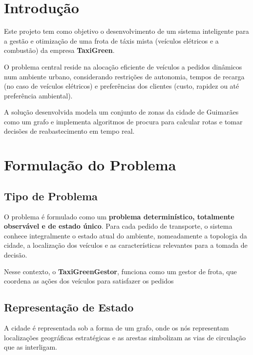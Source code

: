 \documentclass[11pt, a4paper, fleqn]{article}
\begin{document}
	\tableofcontents
	
	\newpage
	
	
	\section{Introdução}
	
	
	Este projeto tem como objetivo o desenvolvimento de um sistema inteligente para a gestão e otimização de uma frota de táxis mista (veículos elétricos e a combustão) da empresa \textbf{TaxiGreen}.
	
	O problema central reside na alocação eficiente de veículos a pedidos dinâmicos num ambiente urbano, considerando restrições de autonomia, tempos de recarga (no caso de veículos elétricos) e preferências dos clientes (custo, rapidez ou até preferência ambiental).
	
	A solução desenvolvida modela um conjunto de zonas da cidade de Guimarães como um grafo e implementa algoritmos de procura para calcular rotas e tomar decisões de reabastecimento em tempo real.
	
	\section{Formulação do Problema}
	
	\subsection{Tipo de Problema}
	
	O problema é formulado como um \textbf{problema determinístico, totalmente observável e de estado único}. Para cada pedido de transporte, o sistema conhece integralmente o estado atual do ambiente, nomeadamente a topologia da cidade, a localização dos veículos e as características relevantes para a tomada de decisão.
	
	Nesse contexto, o \textbf{TaxiGreenGestor}, funciona como
	um gestor de frota, que coordena as ações dos veículos para satisfazer os pedidos
	
	
	
	\subsection{Representação de Estado}
	
	A cidade é representada sob a forma de um grafo, onde os nós representam localizações geográficas estratégicas e as arestas simbolizam as vias de circulação que as interligam.
	
\end{document}
